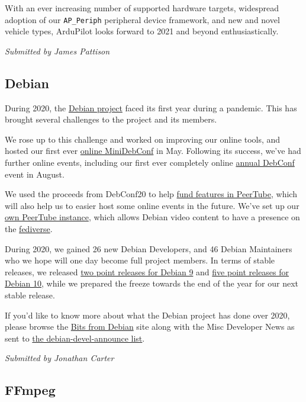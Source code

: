 \documentclass[a4paper]{report}
\begin{document}
With an ever increasing number of supported hardware targets, widespread adoption of our \texttt{AP\_Periph} peripheral device framework, and new and novel vehicle types, ArduPilot looks forward to 2021 and beyond enthusiastically.

{\em Submitted by James Pattison}

\subsection{Debian}

During 2020, the \href{https://www.debian.org/}{Debian project} faced its first year during a pandemic.  This has brought several challenges to the project and its members.

We rose up to this challenge and worked on improving our online tools, and hosted our first ever \href{https://wiki.debian.org/DebianEvents/internet/2020/MiniDebConfOnline}{online MiniDebConf} in May. Following its success, we've had further online events, including our first ever completely online \href{https://debconf20.debconf.org/}{annual DebConf} event in August.

We used the proceeds from DebConf20 to help \href{https://bits.debian.org/2020/10/debian-donation-peertube.html}{fund features in PeerTube}, which will also help us to easier host some online events in the future. We've set up our \href{https://peertube.debian.social}{own PeerTube instance}, which allows
Debian video content to have a presence on the \href{https://en.wikipedia.org/wiki/Fediverse}{fediverse}.

During 2020, we gained 26 new Debian Developers, and 46 Debian Maintainers who we hope will one day become full project members.  In terms of stable releases, we released \href{https://wiki.debian.org/DebianStretch#Release_and_updates}{two point releases for Debian 9} and \href{https://wiki.debian.org/DebianBuster#Release_and_updates}{five point releases for Debian 10}, while we prepared the freeze towards the end of the year for our next stable release.

If you'd like to know more about what the Debian project has done over 2020, please browse the \href{https://bits.debian.org/}{Bits from Debian} site along with the Misc Developer News as sent to \href{https://lists.debian.org/debian-devel-announce/}{the debian-devel-announce list}.

{\em Submitted by Jonathan Carter}

\subsection{FFmpeg}
\end{document}
